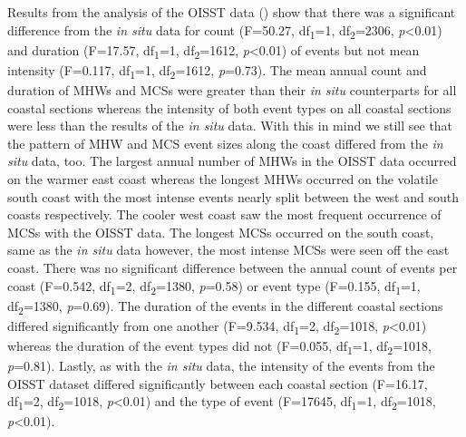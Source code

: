 \documentclass[a4paper,10pt,review]{elsarticle}
\begin{document}
Results from the analysis of the OISST data () show that there was a significant difference from the \emph{in situ} data for count (F=50.27, df\textsubscript{1}=1, df\textsubscript{2}=2306, \emph{p}<0.01) and duration (F=17.57, df\textsubscript{1}=1, df\textsubscript{2}=1612, \emph{p}<0.01) of events but not mean intensity (F=0.117, df\textsubscript{1}=1, df\textsubscript{2}=1612, \emph{p}=0.73). The mean annual count and duration of MHWs and MCSs were greater than their \emph{in situ} counterparts for all coastal sections whereas the intensity of both event types on all coastal sections were less than the results of the \emph{in situ} data. With this in mind we still see that the pattern of MHW and MCS event sizes along the coast differed from the \emph{in situ} data, too. The largest annual number of MHWs in the OISST data occurred on the warmer east coast whereas the longest MHWs occurred on the volatile south coast with the most intense events nearly split between the west and south coasts respectively. The cooler west coast saw the most frequent occurrence of MCSs with the OISST data. The longest MCSs occurred on the south coast, same as the \emph{in situ} data however, the most intense MCSs were seen off the east coast. There was no significant difference between the annual count of events per coast (F=0.542, df\textsubscript{1}=2, df\textsubscript{2}=1380, \emph{p}=0.58) or event type (F=0.155, df\textsubscript{1}=1, df\textsubscript{2}=1380, \emph{p}=0.69). The duration of the events in the different coastal sections differed significantly from one another (F=9.534, df\textsubscript{1}=2, df\textsubscript{2}=1018, \emph{p}<0.01) whereas the duration of the event types did not (F=0.055, df\textsubscript{1}=1, df\textsubscript{2}=1018, \emph{p}=0.81). Lastly, as with the \emph{in situ} data, the intensity of the events from the OISST dataset differed significantly between each coastal section (F=16.17, df\textsubscript{1}=2, df\textsubscript{2}=1018, \emph{p}<0.01) and the type of event (F=17645, df\textsubscript{1}=1, df\textsubscript{2}=1018, \emph{p}<0.01).
\end{document}
